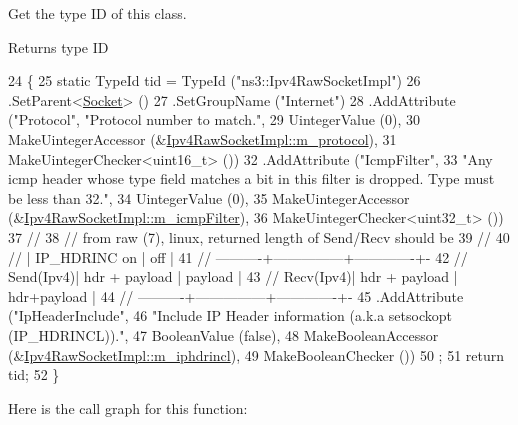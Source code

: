 Get the type ID of this class. 

\begin{DoxyReturn}{Returns}
type ID 
\end{DoxyReturn}

\begin{DoxyCode}
24 \{
25   \textcolor{keyword}{static} TypeId tid = TypeId (\textcolor{stringliteral}{"ns3::Ipv4RawSocketImpl"})
26     .SetParent<\hyperlink{classns3_1_1Socket_a1e22267afc490a4b15b8a764289a4000}{Socket}> ()
27     .SetGroupName (\textcolor{stringliteral}{"Internet"})
28     .AddAttribute (\textcolor{stringliteral}{"Protocol"}, \textcolor{stringliteral}{"Protocol number to match."},
29                    UintegerValue (0),
30                    MakeUintegerAccessor (&\hyperlink{classns3_1_1Ipv4RawSocketImpl_a924effb0eb9a6cbbf1daeb3a7b7ffc94}{Ipv4RawSocketImpl::m\_protocol}),
31                    MakeUintegerChecker<uint16\_t> ())
32     .AddAttribute (\textcolor{stringliteral}{"IcmpFilter"}, 
33                    \textcolor{stringliteral}{"Any icmp header whose type field matches a bit in this filter is dropped. Type must be
       less than 32."},
34                    UintegerValue (0),
35                    MakeUintegerAccessor (&\hyperlink{classns3_1_1Ipv4RawSocketImpl_ab80bb1194c37a7489b342156a7bfcb92}{Ipv4RawSocketImpl::m\_icmpFilter}),
36                    MakeUintegerChecker<uint32\_t> ())
37     \textcolor{comment}{// }
38     \textcolor{comment}{//  from raw (7), linux, returned length of Send/Recv should be}
39     \textcolor{comment}{// }
40     \textcolor{comment}{//            | IP\_HDRINC on  |      off    |}
41     \textcolor{comment}{//  ----------+---------------+-------------+-}
42     \textcolor{comment}{//  Send(Ipv4)| hdr + payload | payload     |}
43     \textcolor{comment}{//  Recv(Ipv4)| hdr + payload | hdr+payload |}
44     \textcolor{comment}{//  ----------+---------------+-------------+-}
45     .AddAttribute (\textcolor{stringliteral}{"IpHeaderInclude"}, 
46                    \textcolor{stringliteral}{"Include IP Header information (a.k.a setsockopt (IP\_HDRINCL))."},
47                    BooleanValue (\textcolor{keyword}{false}),
48                    MakeBooleanAccessor (&\hyperlink{classns3_1_1Ipv4RawSocketImpl_a895d0929c6fb2c111f99e83a8b7516fc}{Ipv4RawSocketImpl::m\_iphdrincl}),
49                    MakeBooleanChecker ())
50   ;
51   \textcolor{keywordflow}{return} tid;
52 \}
\end{DoxyCode}


Here is the call graph for this function\+:


